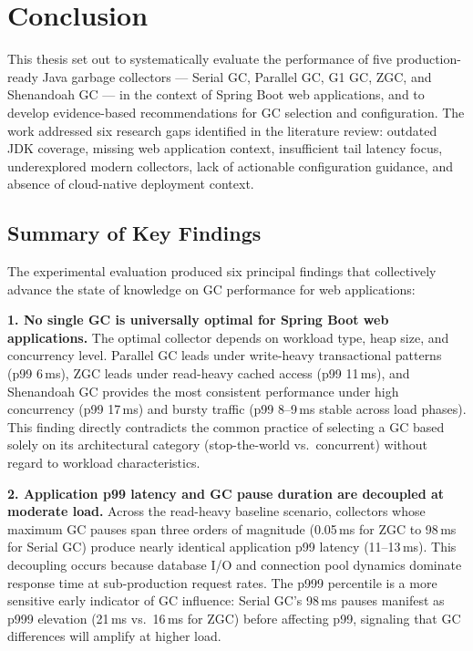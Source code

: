 \chapter*{Conclusion}

This thesis set out to systematically evaluate the performance of five production-ready Java garbage collectors --- Serial GC, Parallel GC, G1 GC, ZGC, and Shenandoah GC --- in the context of Spring Boot web applications, and to develop evidence-based recommendations for GC selection and configuration. The work addressed six research gaps identified in the literature review: outdated JDK coverage, missing web application context, insufficient tail latency focus, underexplored modern collectors, lack of actionable configuration guidance, and absence of cloud-native deployment context.

\section*{Summary of Key Findings}

The experimental evaluation produced six principal findings that collectively advance the state of knowledge on GC performance for web applications:

\textbf{1. No single GC is universally optimal for Spring Boot web applications.} The optimal collector depends on workload type, heap size, and concurrency level. Parallel GC leads under write-heavy transactional patterns (p99 6\,ms), ZGC leads under read-heavy cached access (p99 11\,ms), and Shenandoah GC provides the most consistent performance under high concurrency (p99 17\,ms) and bursty traffic (p99 8--9\,ms stable across load phases). This finding directly contradicts the common practice of selecting a GC based solely on its architectural category (stop-the-world vs.\ concurrent) without regard to workload characteristics.

\textbf{2. Application p99 latency and GC pause duration are decoupled at moderate load.} Across the read-heavy baseline scenario, collectors whose maximum GC pauses span three orders of magnitude (0.05\,ms for ZGC to 98\,ms for Serial GC) produce nearly identical application p99 latency (11--13\,ms). This decoupling occurs because database I/O and connection pool dynamics dominate response time at sub-production request rates. The p999 percentile is a more sensitive early indicator of GC influence: Serial GC's 98\,ms pauses manifest as p999 elevation (21\,ms vs.\ 16\,ms for ZGC) before affecting p99, signaling that GC differences will amplify at higher load.


